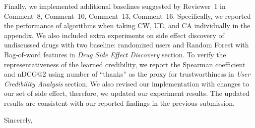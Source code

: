 \documentclass[11pt,a4paper]{letter} %
\begin{document}
\begin{letter}
Finally, we implemented additional baselines suggested by Reviewer~1 in Comment~8, Comment~10, Comment~13, Comment~16. Specifically, we reported the performance of algorithms when taking CW, UE, and CA individually in the appendix. We also included extra experiments on side effect discovery of undiscussed drugs with two baseline: randomized users and Random Forest with Bag-of-word features in {\it Drug Side Effect Discovery} section. To verify the representativeness of the learned credibility, we report the Spearman coefficient and nDCG@2 using number of ``thanks'' as the proxy for trustworthiness in {\it User Credibility Analysis} section. We also revised our implementation with changes to our set of side effect, therefore, we updated our experiment results. The updated results are consistent with our reported findings in the previous submission.

\closing{Sincerely,}


\end{letter}
\end{document}
